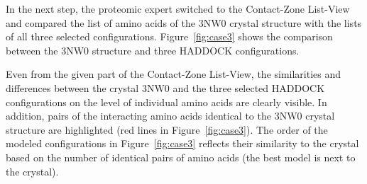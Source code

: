 \documentclass[twocolumn]{bmcart}%
\def\MatView {Matrix View\xspace}
\def\CoZoListView {Contact-Zone List-View\xspace}
\begin{document}

In the next step, the proteomic expert switched to the \CoZoListView and compared the list of amino acids of the 3NW0 crystal structure with the lists of all three selected configurations.
Figure~\ref{fig:case3} shows the comparison between the 3NW0 structure and three HADDOCK configurations.


Even from the given part of the \CoZoListView, the similarities and differences between the crystal 3NW0 and the three selected HADDOCK configurations on the level of individual amino acids are clearly visible.
In addition, pairs of the interacting amino acids identical to the 3NW0 crystal structure are highlighted (red lines in Figure~\ref{fig:case3}). The order of the modeled configurations in Figure~\ref{fig:case3} reflects their similarity to the crystal based on the number of identical pairs of amino acids (the best model is next to the crystal).


\end{document}
